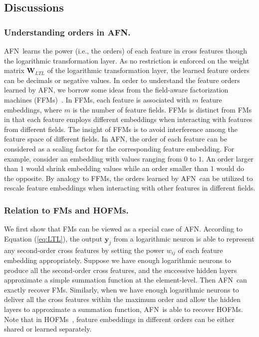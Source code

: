 \documentclass[letterpaper]{article} \usepackage{aaai20}  \usepackage{times}  \usepackage{helvet} \usepackage{courier}  \usepackage[hyphens]{url}  \usepackage{graphicx} \urlstyle{rm} \def\UrlFont{\rm}  \usepackage{graphicx}  \frenchspacing  \setlength{\pdfpagewidth}{8.5in}  \setlength{\pdfpageheight}{11in}
\newcommand{\model}{{AFN}~}
\newcommand{\modelns}{{AFN}}
\begin{document}
\subsection{Discussions}

\subsubsection{Understanding orders in \modelns.}
\model learns the power (i.e., the orders) of each feature in cross features though the logarithmic transformation layer. As no restriction is enforced on the weight matrix $\mathbf{W}_{LTL}$ of the logarithmic transformation layer, the learned feature orders can be decimals or negative values.
In order to understand the feature orders learned by \modelns, we borrow some ideas from the field-aware factorization machines (FFMs)~\cite{FFM}. In FFMs, each feature is associated with $m$ feature embeddings, where $m$ is the number of feature fields. FFMs is distinct from FMs in that each feature employs different embeddings when interacting with features from different fields. The insight of FFMs is to avoid interference among the feature space of different fields. 
In \modelns, the order of each feature can be considered as a scaling factor for the corresponding feature embedding. For example, consider an embedding with values ranging from $0$ to $1$. An order larger than $1$ would shrink embedding values while an order smaller than $1$ would do the opposite. By analogy to FFMs, the orders learned by \model can be utilized to rescale feature embeddings when interacting with other features in different fields.

\subsubsection{Relation to FMs and HOFMs.}
We first show that FMs can be viewed as a special case of \modelns.
According to Equation (\ref{eq:LTL}), the output $\mathbf{y}_j$ from a logarithmic neuron is able to represent any second-order cross features by setting the power $w_{ij}$ of each feature embedding appropriately.
Suppose we have enough logarithmic neurons to produce all the second-order cross features, and the successive hidden layers approximate a simple summation function at the element-level. Then \model can exactly recover FMs.
Similarly, when we have enough logarithmic neurons to deliver all the cross features within the maximum order and allow the hidden layers to approximate a summation function, \model is able to recover HOFMs. Note that in HOFMs~\cite{hofm}, feature embeddings in different orders can be either shared or learned separately. 
\end{document}

